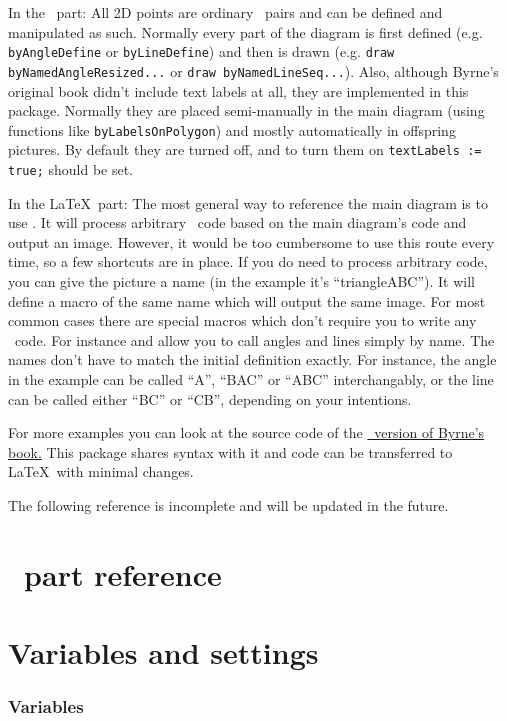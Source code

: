 \documentclass{ltxdoc}
\begin{document}
In the \METAPOST\ part: 
All 2D points are ordinary \METAPOST\ pairs and can be defined and manipulated as such. Normally every part of the diagram is first defined (e.g. \texttt{byAngleDefine} or \texttt{byLineDefine}) and then is drawn (e.g. \texttt{draw byNamedAngleResized...} or \texttt{draw byNamedLineSeq...}). Also, although Byrne's original book didn't include text labels at all, they are implemented in this package. Normally they are placed semi-manually in the main diagram (using functions like \texttt{byLabelsOnPolygon}) and mostly automatically in offspring pictures. By default they are turned off, and to turn them on \texttt{textLabels := true;} should be set.

In the \LaTeX\ part: 
The most general way to reference the main diagram is to use . It will process arbitrary \METAPOST\ code based on the main diagram's code and output an image. However, it would be too cumbersome to use this route every time, so a few shortcuts are in place. If you do need to process arbitrary code, you can give the picture a name (in the example it's ``triangleABC''). It will define a macro of the same name  which will output the same image. For most common cases there are special macros which don't require you to write any \METAPOST\ code. For instance  and  allow you to call angles and lines simply by name. The names don't have to match the initial definition exactly. For instance, the angle in the example can be called ``A'', ``BAC'' or ``ABC'' interchangably, or the line can be called either ``BC'' or ``CB'', depending on your intentions.

For more examples you can look at the source code of the \href{https://github.com/jemmybutton/byrne-euclid/}{\ConTeXt\ version of Byrne's book.} This package shares syntax with it and code can be transferred to \LaTeX\ with minimal changes.

The following reference is incomplete and will be updated in the future.

\section{\METAPOST\ part reference}

\section{Variables and settings}

\subsubsection{Variables}\label{Variable}
	
\end{document}
